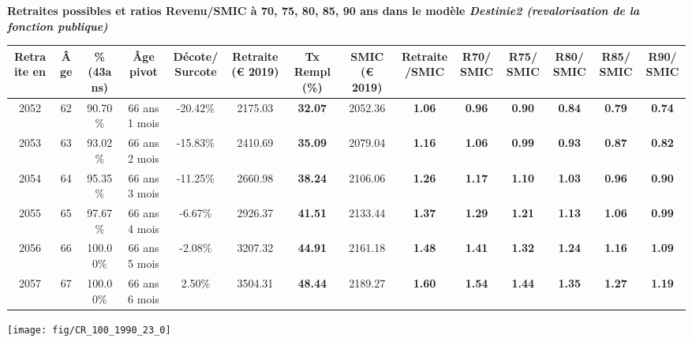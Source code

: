  \vspace{0.1cm} 
{\bf \noindent Retraites possibles et ratios Revenu/SMIC à 70, 75, 80, 85, 90 ans dans le modèle \emph{Destinie2 (revalorisation de la fonction publique)}}  
 
\begin{adjustbox}{max width=\textwidth} 
\begin{tabular}[htb]{|c|c||c|c|c||c|c||c|c||c|c|c|c|c|} 
\hline 
 Retraite en &  Âge &  \%(43ans) &  Âge pivot &  Décote/Surcote &  Retraite (\euro{} 2019) &  Tx Rempl(\%) &  SMIC (\euro{} 2019) &  Retraite/SMIC &  R70/SMIC &  R75/SMIC &  R80/SMIC &  R85/SMIC &  R90/SMIC \\ 
\hline \hline 
 2052 &  62 &  90.70\% &  66 ans 1 mois &  -20.42\% &  2175.03 &  {\bf 32.07} &  2052.36 &  {\bf 1.06} &  {\bf {\color{red} 0.96}} &  {\bf {\color{red} 0.90}} &  {\bf {\color{red} 0.84}} &  {\bf {\color{red} 0.79}} &  {\bf {\color{red} 0.74}} \\ 
\hline 
 2053 &  63 &  93.02\% &  66 ans 2 mois &  -15.83\% &  2410.69 &  {\bf 35.09} &  2079.04 &  {\bf 1.16} &  {\bf 1.06} &  {\bf {\color{red} 0.99}} &  {\bf {\color{red} 0.93}} &  {\bf {\color{red} 0.87}} &  {\bf {\color{red} 0.82}} \\ 
\hline 
 2054 &  64 &  95.35\% &  66 ans 3 mois &  -11.25\% &  2660.98 &  {\bf 38.24} &  2106.06 &  {\bf 1.26} &  {\bf 1.17} &  {\bf 1.10} &  {\bf 1.03} &  {\bf {\color{red} 0.96}} &  {\bf {\color{red} 0.90}} \\ 
\hline 
 2055 &  65 &  97.67\% &  66 ans 4 mois &  -6.67\% &  2926.37 &  {\bf 41.51} &  2133.44 &  {\bf 1.37} &  {\bf 1.29} &  {\bf 1.21} &  {\bf 1.13} &  {\bf 1.06} &  {\bf {\color{red} 0.99}} \\ 
\hline 
 2056 &  66 &  100.00\% &  66 ans 5 mois &  -2.08\% &  3207.32 &  {\bf 44.91} &  2161.18 &  {\bf 1.48} &  {\bf 1.41} &  {\bf 1.32} &  {\bf 1.24} &  {\bf 1.16} &  {\bf 1.09} \\ 
\hline 
 2057 &  67 &  100.00\% &  66 ans 6 mois &  2.50\% &  3504.31 &  {\bf 48.44} &  2189.27 &  {\bf 1.60} &  {\bf 1.54} &  {\bf 1.44} &  {\bf 1.35} &  {\bf 1.27} &  {\bf 1.19} \\ 
\hline 
\hline 
\end{tabular} 
\end{adjustbox} 
 
 \vspace{0.1cm} 

 {\hspace{-2.2cm}\texttt{[image: fig/CR\_100\_1990\_23\_0]}} 

